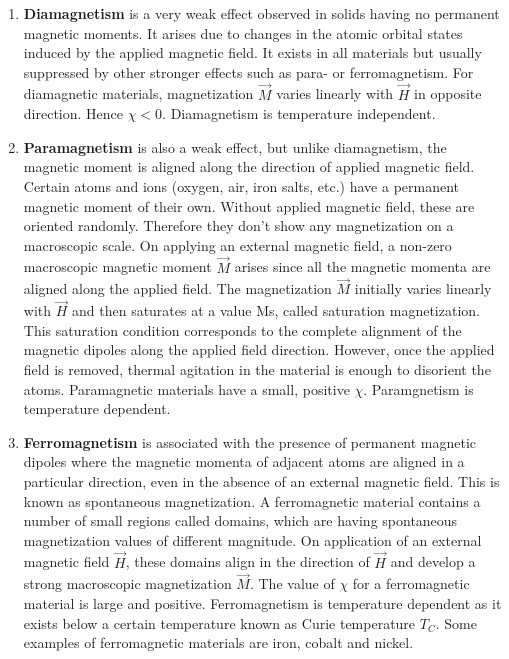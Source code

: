 \begin{enumerate}
    \item \textbf{Diamagnetism} is a very weak effect observed in solids having no permanent magnetic moments. It arises due to changes in the atomic orbital states induced by the applied magnetic field. It exists in all materials but usually suppressed by other stronger effects such as para- or ferromagnetism. For diamagnetic materials, magnetization $\vec{M}$ varies linearly with $\vec{H}$ in opposite direction. Hence $\chi < 0$. Diamagnetism is temperature independent.\\
    \item \textbf{Paramagnetism} is also a weak effect, but unlike diamagnetism, the magnetic moment is aligned along the direction of applied magnetic field. Certain atoms and ions (oxygen, air, iron salts, etc.) have a permanent magnetic moment of their own. Without applied magnetic field, these are oriented randomly. Therefore they don’t show any magnetization on a macroscopic scale. On applying an external magnetic field, a non-zero macroscopic magnetic moment $\vec{M}$ arises since all the magnetic momenta are aligned along the applied field. The magnetization $\vec{M}$ initially varies linearly with $\vec{H}$ and then saturates at a value Ms, called saturation magnetization. This saturation condition corresponds to the complete alignment of the magnetic dipoles along the applied field direction. However, once the applied field is removed, thermal agitation in the material is enough to disorient the atoms. Paramagnetic materials have a small, positive $\chi$. Paramgnetism is temperature dependent.\\
    \item \textbf{Ferromagnetism} is associated with the presence of permanent magnetic dipoles where the magnetic momenta of adjacent atoms are aligned in a particular direction, even in the absence of an external magnetic field. This is known as spontaneous magnetization. A ferromagnetic material contains a number of small regions called domains, which are having spontaneous magnetization values of different magnitude. On application of an external magnetic field $\vec{H}$, these domains align in the direction of $\vec{H}$ and develop a strong macroscopic magnetization $\vec{M}$. The value of $\chi$ for a ferromagnetic material is large and positive. Ferromagnetism is temperature dependent as it exists below a certain temperature known as Curie temperature $T_C$. Some examples of ferromagnetic materials are iron, cobalt and nickel.
\end{enumerate}

